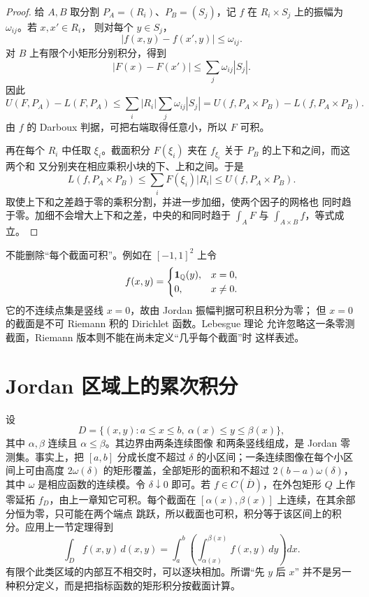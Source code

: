 \begin{proof}
给 \(A,B\) 取分割 \(P_A=(R_i)\)、\(P_B=(S_j)\)，记 \(f\) 在
\(R_i\times S_j\) 上的振幅为 \(\omega_{ij}\)。若 \(x,x'\in R_i\)，
则对每个 \(y\in S_j\)，
\[
 |f(x,y)-f(x',y)|\le\omega_{ij}.
\]
对 \(B\) 上有限个小矩形分别积分，得到
\[
 |F(x)-F(x')|\le\sum_j\omega_{ij}|S_j|.
\]
因此
\[
 U(F,P_A)-L(F,P_A)
 \le\sum_i|R_i|\sum_j\omega_{ij}|S_j|
 =U(f,P_A\times P_B)-L(f,P_A\times P_B).
\]
由 \(f\) 的 Darboux 判据，可把右端取得任意小，所以 \(F\) 可积。

再在每个 \(R_i\) 中任取 \(\xi_i\)。截面积分
\(F(\xi_i)\) 夹在 \(f_{\xi_i}\) 关于 \(P_B\) 的上下和之间，而这两个和
又分别夹在相应乘积小块的下、上和之间。于是
\[
 L(f,P_A\times P_B)
 \le\sum_iF(\xi_i)|R_i|
 \le U(f,P_A\times P_B).
\]
取使上下和之差趋于零的乘积分割，并进一步加细，使两个因子的网格也
同时趋于零。加细不会增大上下和之差，中央的和同时趋于
\(\int_AF\) 与 \(\int_{A\times B}f\)，等式成立。
\end{proof}

不能删除“每个截面可积”。例如在 \([-1,1]^2\) 上令
\[
 f(x,y)=
 \begin{cases}
  \mathbf1_{\mathbb{Q}}(y),&x=0,\\
  0,&x\ne0.
 \end{cases}
\]
它的不连续点集是竖线 \(x=0\)，故由 Jordan 振幅判据可积且积分为零；
但 \(x=0\) 的截面是不可 Riemann 积的 Dirichlet 函数。Lebesgue 理论
允许忽略这一条零测截面，Riemann 版本则不能在尚未定义“几乎每个截面”时
这样表述。

\section{Jordan 区域上的累次积分}

设
\[
 D=\{(x,y):a\le x\le b,
               \ \alpha(x)\le y\le\beta(x)\},
\]
其中 \(\alpha,\beta\) 连续且 \(\alpha\le\beta\)。其边界由两条连续图像
和两条竖线组成，是 Jordan 零测集。事实上，把 \([a,b]\) 分成长度不超过
\(\delta\) 的小区间；一条连续图像在每个小区间上可由高度
\(2\omega(\delta)\) 的矩形覆盖，全部矩形的面积和不超过
\(2(b-a)\omega(\delta)\)，其中 \(\omega\) 是相应函数的连续模。令
\(\delta\downarrow0\) 即可。若 \(f\in C(\overline D)\)，在外包矩形
\(Q\) 上作零延拓 \(f_D\)，由上一章知它可积。每个截面在
\([\alpha(x),\beta(x)]\) 上连续，在其余部分恒为零，只可能在两个端点
跳跃，所以截面也可积，积分等于该区间上的积分。应用上一节定理得到
\[
 \int_D f(x,y)\,d(x,y)
 =\int_a^b\left(\int_{\alpha(x)}^{\beta(x)}f(x,y)\,dy\right)dx.
\]
有限个此类区域的内部互不相交时，可以逐块相加。所谓“先 \(y\) 后 \(x\)”
并不是另一种积分定义，而是把指标函数的矩形积分按截面计算。

